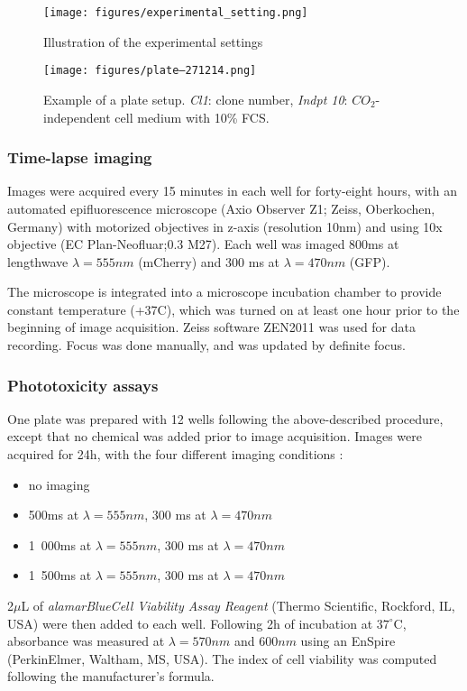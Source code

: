 \begin{figure}
\centering
\texttt{[image: figures/experimental\_setting.png]}
\caption{Illustration of the experimental settings}
\label{exp_setting}
\end{figure}
\begin{figure}
\centering
\texttt{[image: figures/plate--271214.png]}
\caption{Example of a plate setup. \textit{Cl1}: clone number, \textit{Indpt 10}: $CO_2$-independent cell medium with 10\% FCS.}
\label{plate_setup}
\end{figure}
\subsubsection{Time-lapse imaging}
Images were acquired every 15 minutes in each well for forty-eight hours, with an automated epifluorescence microscope (Axio Observer Z1; Zeiss, Oberkochen, Germany) with motorized objectives in z-axis (resolution 10nm) and using 10x objective (EC Plan-Neofluar;0.3 M27). Each well was imaged 800ms at lengthwave $\lambda = 555nm$ (mCherry) and 300 ms at $\lambda = 470nm$ (GFP).

The microscope is integrated into a microscope incubation chamber to provide constant temperature (+37C), which was turned on at least one hour prior to the beginning of image acquisition. Zeiss software ZEN2011 was used for data recording. Focus was done manually, and was updated by definite focus.
\subsubsection{Phototoxicity assays}
One plate was prepared with 12 wells following the above-described procedure, except that no chemical was added prior to image acquisition. Images were acquired for 24h, with the four different imaging conditions :
\begin{itemize}
\item no imaging
\item 500ms at $\lambda = 555nm$, 300 ms at $\lambda = 470nm$
\item 1~000ms at $\lambda = 555nm$, 300 ms at $\lambda = 470nm$
\item 1~500ms at $\lambda = 555nm$, 300 ms at $\lambda = 470nm$
\end{itemize}
2$\mu$L of \textit{alamarBlue\texttrademark Cell Viability Assay Reagent} (Thermo Scientific, Rockford, IL, USA) were then added to each well. Following 2h of incubation at $37^\circ$C, absorbance was measured at $\lambda = 570nm$ and $600nm$ using an EnSpire\up{\textregistered} (PerkinElmer, Waltham, MS, USA). The index of cell viability was computed following the manufacturer's formula.


